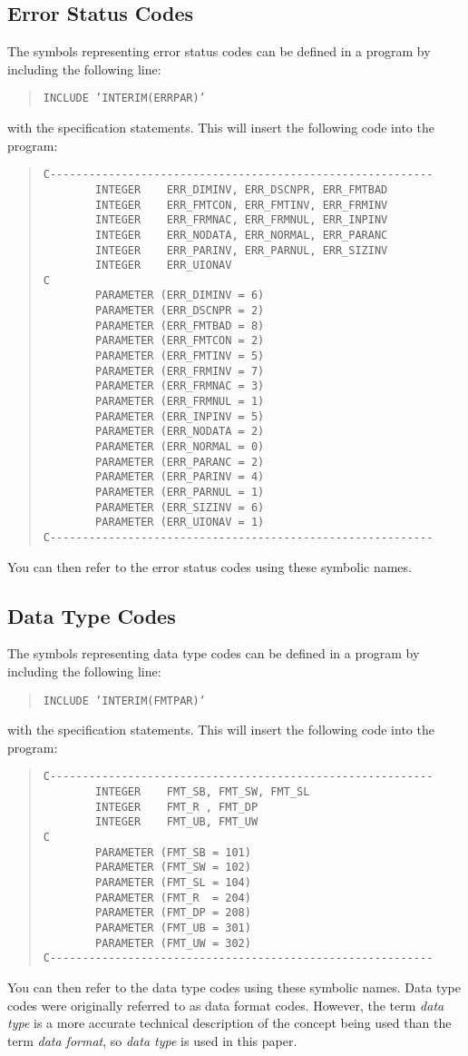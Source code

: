 \documentclass{article}
\begin{document}
\subsection {Error Status Codes}
The symbols representing error status codes can be defined in a program by
including the following line:
\begin{quote}
{\tt INCLUDE 'INTERIM(ERRPAR)'}
\end{quote}
with the specification statements.
This will insert the following code into the program:
\begin{quote}
\begin{verbatim}
C-----------------------------------------------------------
        INTEGER    ERR_DIMINV, ERR_DSCNPR, ERR_FMTBAD
        INTEGER    ERR_FMTCON, ERR_FMTINV, ERR_FRMINV
        INTEGER    ERR_FRMNAC, ERR_FRMNUL, ERR_INPINV
        INTEGER    ERR_NODATA, ERR_NORMAL, ERR_PARANC
        INTEGER    ERR_PARINV, ERR_PARNUL, ERR_SIZINV
        INTEGER    ERR_UIONAV
C
        PARAMETER (ERR_DIMINV = 6)
        PARAMETER (ERR_DSCNPR = 2)
        PARAMETER (ERR_FMTBAD = 8)
        PARAMETER (ERR_FMTCON = 2)
        PARAMETER (ERR_FMTINV = 5)
        PARAMETER (ERR_FRMINV = 7)
        PARAMETER (ERR_FRMNAC = 3)
        PARAMETER (ERR_FRMNUL = 1)
        PARAMETER (ERR_INPINV = 5)
        PARAMETER (ERR_NODATA = 2)
        PARAMETER (ERR_NORMAL = 0)
        PARAMETER (ERR_PARANC = 2)
        PARAMETER (ERR_PARINV = 4)
        PARAMETER (ERR_PARNUL = 1)
        PARAMETER (ERR_SIZINV = 6)
        PARAMETER (ERR_UIONAV = 1)
C-----------------------------------------------------------
\end{verbatim}
\end{quote}
You can then refer to the error status codes using these symbolic names.
\subsection {Data Type Codes}
The symbols representing data type codes can be defined in a program by
including the following line:
\begin{quote}
{\tt INCLUDE 'INTERIM(FMTPAR)'}
\end{quote}
with the specification statements.
This will insert the following code into the program:
\begin{quote}
\begin{verbatim}
C-----------------------------------------------------------
        INTEGER    FMT_SB, FMT_SW, FMT_SL
        INTEGER    FMT_R , FMT_DP
        INTEGER    FMT_UB, FMT_UW
C
        PARAMETER (FMT_SB = 101)
        PARAMETER (FMT_SW = 102)
        PARAMETER (FMT_SL = 104)
        PARAMETER (FMT_R  = 204)
        PARAMETER (FMT_DP = 208)
        PARAMETER (FMT_UB = 301)
        PARAMETER (FMT_UW = 302)
C-----------------------------------------------------------
\end{verbatim}
\end{quote}
You can then refer to the data type codes using these symbolic names.
Data type codes were originally referred to as data format codes.
However, the term {\em data type} is a more accurate technical description of the
concept being used than the term {\em data format}, so {\em data type} is used in this
paper.
\end{document}
